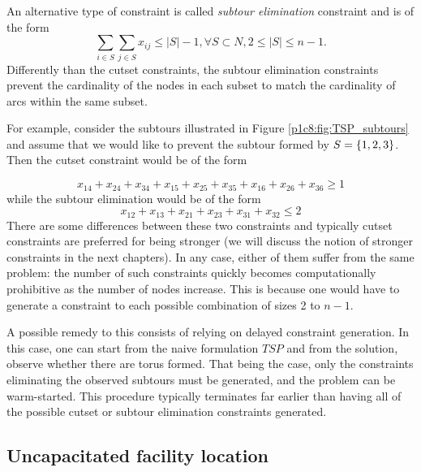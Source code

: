 An alternative type of constraint is called \emph{subtour elimination} constraint and is of the form
%
\begin{equation*}
	\sum_{i \in S}\sum_{j \in S}x_{ij} \leq |S|-1, \forall S \subset N, 2 \leq |S| \leq n-1. 
\end{equation*}
%
Differently than the cutset constraints, the subtour elimination constraints prevent the cardinality of the nodes in each subset to match the cardinality of arcs within the same subset.

For example, consider the subtours illustrated in Figure \ref{p1c8:fig:TSP_subtours} and assume that we would like to prevent the subtour formed by $S = \left\{ 1,2,3 \right \}$. Then the cutset constraint would be of the form

\begin{equation*}
	x_{14} + x_{24} + x_{34} + x_{15} + x_{25} + x_{35} + x_{16} + x_{26} + x_{36}\geq 1	
\end{equation*}
%
while the subtour elimination would be of the form
\begin{equation*}
	x_{12} + x_{13} + x_{21} + x_{23} + x_{31} + x_{32} \leq 2
\end{equation*}
%
There are some differences between these two constraints and typically cutset constraints are preferred for being stronger (we will discuss the notion of stronger constraints in the next chapters). In any case, either of them suffer from the same problem: the number of such constraints quickly becomes computationally prohibitive as the number of nodes increase. This is because one would have to generate a constraint to each possible combination of sizes 2 to $n-1$. 

A possible remedy to this consists of relying on delayed constraint generation. In this case, one can start from the naive formulation $TSP$ and from the solution, observe whether there are torus formed. That being the case, only the constraints eliminating the observed subtours must be generated, and the problem can be warm-started. This procedure typically terminates far earlier than having all of the possible cutset or subtour elimination constraints generated. 


\subsection{Uncapacitated facility location}

